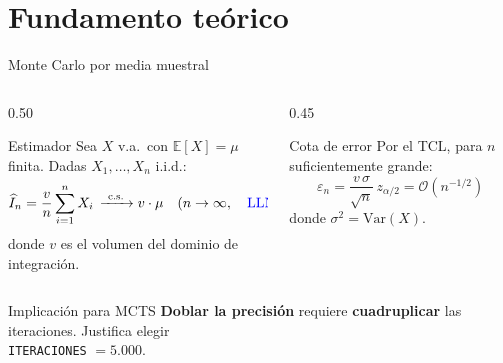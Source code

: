 \documentclass[aspectratio=169, 10pt]{beamer}
\begin{document}
\section{Fundamento teórico}

\begin{frame}{Monte Carlo por media muestral}
  \begin{columns}[T]
    \begin{column}{0.50\textwidth}
      \begin{block}{Estimador}
        Sea $X$ v.a.\ con $\mathbb{E}[X] = \mu$ finita. Dadas $X_1,\ldots,X_n$
        i.i.d.:
        \[
          \widehat{I}_n = \frac{v}{n}\sum_{i=1}^n X_i\,\xrightarrow{\ \text{c.s.}\ } v\cdot\mu
          \quad (n\to\infty,\quad \textcolor{blue}{\text{LLN}})
        \]
        donde $v$ es el volumen del dominio de integración.
      \end{block}
    \end{column}
    \begin{column}{0.45\textwidth}
      \begin{exampleblock}{Cota de error}
        Por el TCL, para $n$ suficientemente grande:
        \vspace{2ex}
        \[
          \varepsilon_n
          = \frac{v\,\sigma}{\sqrt{n}}\,z_{\alpha/2}
          = \mathcal{O}(n^{-1/2})
        \]
        \vspace{2ex}
        donde $\sigma^2 = \mathrm{Var}(X)$.
      \end{exampleblock}
    \end{column}
  \end{columns}
  \begin{alertblock}{Implicación para MCTS}
        \textbf{Doblar la precisión} requiere \textbf{cuadruplicar}
        las iteraciones. Justifica elegir\\
        \centering
        \texttt{ITERACIONES} $= 5.000$.
      \end{alertblock}
\end{frame}
\end{document}
